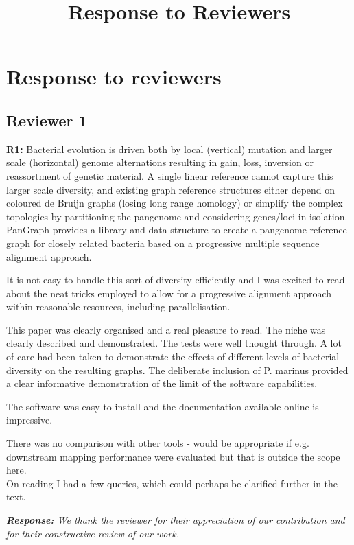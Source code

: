 \documentclass[aps,rmp,onecolumn]{revtex4-1}
\title{Response to Reviewers}
\newcommand{\reviewer}[2]{\textbf{#1:} #2\vskip 5mm}
\newcommand{\response}[1]{{\it {\color{response}\textbf{Response:} #1}}\vskip 5mm}
\begin{document}
\maketitle

\section*{Response to reviewers}

\subsection*{Reviewer 1}

\reviewer{R1}{Bacterial evolution is driven both by local (vertical) mutation and larger scale (horizontal) genome alternations resulting in gain, loss, inversion or reassortment of genetic material. A single linear reference cannot capture this larger scale diversity, and existing graph reference structures either depend on coloured de Bruijn graphs (losing long range homology) or simplify the complex topologies by partitioning the pangenome and considering genes/loci in isolation. PanGraph provides a library and data structure to create a pangenome reference graph for closely related bacteria based on a progressive multiple sequence alignment approach.

      It is not easy to handle this sort of diversity efficiently and I was excited to read about the neat tricks employed to allow for a progressive alignment approach within reasonable resources, including parallelisation.

      This paper was clearly organised and a real pleasure to read. The niche was clearly described and demonstrated. The tests were well thought through. A lot of care had been taken to demonstrate the effects of different levels of bacterial diversity on the resulting graphs. The deliberate inclusion of P. marinus provided a clear informative demonstration of the limit of the software capabilities.

      The software was easy to install and the documentation available online is impressive.

      There was no comparison with other tools - would be appropriate if e.g. downstream mapping performance were evaluated but that is outside the scope here.\\

      On reading I had a few queries, which could perhaps be clarified further in the text.}

\response{We thank the reviewer for their appreciation of our contribution and for their constructive review of our work.}
\end{document}
